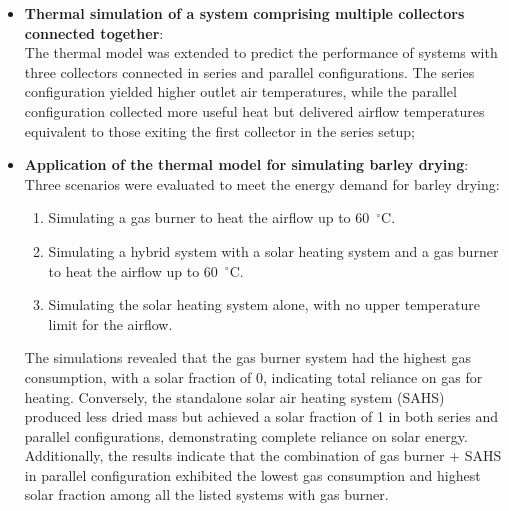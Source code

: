 \begin{itemize}
	\item \textbf{Thermal simulation of a system comprising multiple collectors connected together}: \\
	The thermal model was extended to predict the performance of systems with three collectors connected in series and parallel configurations. The series configuration yielded higher outlet air temperatures, while the parallel configuration collected more useful heat but delivered airflow temperatures equivalent to those exiting the first collector in the series setup;
	\\
	
	\item \textbf{Application of the thermal model for simulating barley drying}: \\
	Three scenarios were evaluated to meet the energy demand for barley drying: 
	\begin{enumerate}
		\item Simulating a gas burner to heat the airflow up to 60~$^{\circ}$C.
		\item Simulating a hybrid system with a solar heating system and a gas burner to heat the airflow up to 60~$^{\circ}$C.
		\item Simulating the solar heating system alone, with no upper temperature limit for the airflow.
	\end{enumerate}
	The simulations revealed that the gas burner system had the highest gas consumption, with a solar fraction of 0, indicating total reliance on gas for heating. Conversely, the standalone solar air heating system (SAHS) produced less dried mass but achieved a solar fraction of 1 in both series and parallel configurations, demonstrating complete reliance on solar energy. Additionally, the results indicate that the combination of gas burner + SAHS in parallel configuration exhibited the lowest gas consumption and highest solar fraction among all the listed systems with gas burner.
	
\end{itemize}
	


